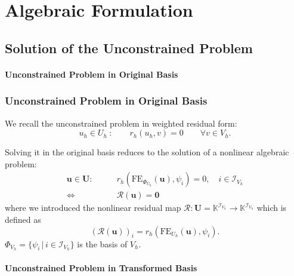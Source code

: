 \section{Algebraic Formulation}

\subsection{Solution of the Unconstrained Problem}

\paragraph{Unconstrained Problem in Original Basis}

\begin{frame}
\frametitle<presentation>{Unconstrained Problem in Original Basis}
We recall the unconstrained problem in weighted residual form:
\begin{equation}
u_h\in U_h\ : \qquad r_h(u_h,v) = 0 \qquad \forall
v\in V_h .
\end{equation}

Solving it in the original basis
reduces to the solution of a nonlinear algebraic problem:
\begin{equation}
\begin{split}
\mathbf{u}\in\mathbf{U} : \qquad
& r_h\left(\text{FE}_{\Phi_{U_h}}(\mathbf{u}),\psi_i\right) = 0, \quad
i\in\mathcal{I}_{V_h} \\
\Leftrightarrow \  & \mathcal{R}(\mathbf{u}) = \mathbf{0}
\end{split}
\end{equation}
where we introduced the nonlinear residual map $\mathcal{R} :
\mathbf{U} = \mathbb{K}^{\mathcal{I}_{V_h}} \to \mathbb{K}^{\mathcal{I}_{V_h}}$ which is defined as 
\begin{equation}
\left(
\mathcal{R}(\mathbf{u})\right)_i =
r_h(\text{FE}_{U_h}(\mathbf{u}),\psi_i).
\end{equation}
$\Phi_{V_h} = \{\psi_i\,|\, i\in\mathcal{I}_{V_h}\}$ is the basis of $V_h$.  
\end{frame}

\paragraph{Unconstrained Problem in Transformed Basis}

